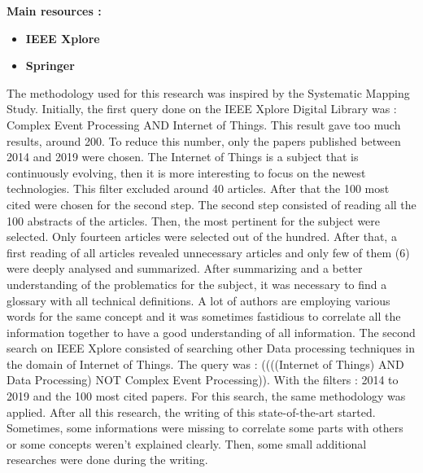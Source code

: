 \documentclass[11pt]{article}
\begin{document}
\textbf{Main resources :}
\begin{itemize}
	\item \textbf{IEEE Xplore} 
	\item \textbf{Springer} 
\end{itemize}

The methodology used for this research was inspired by the Systematic Mapping Study. \cite{sms} Initially, the first query done on the IEEE Xplore Digital Library was : Complex Event Processing AND Internet of Things. This result gave too much results, around 200. To reduce this number, only the papers published between 2014 and 2019 were chosen. The Internet of Things is a subject that is continuously evolving, then it is more interesting to focus on the newest technologies. This filter excluded around 40 articles. After that the 100 most cited were chosen for the second step.
\newline
\newline
The second step consisted of reading all the 100 abstracts of the articles. Then, the most pertinent for the subject were selected. Only fourteen articles were selected out of the hundred. After that, a first reading of all articles revealed unnecessary articles and only few of them (6) were deeply analysed and summarized. After summarizing and a better understanding of the problematics for the subject, it was necessary to find a glossary \cite{glossary} with all technical definitions. A lot of authors are employing various words for the same concept and it was sometimes fastidious to correlate all the information together to have a good understanding of all information.  
\newline
\newline
The second search on IEEE Xplore consisted of searching other Data processing techniques in the domain of Internet of Things. The query was : ((((Internet of Things) AND Data Processing) NOT Complex Event Processing)). With the filters :  2014 to 2019 and the 100 most cited papers. For this search, the same methodology was applied.
\newline
\newline
After all this research, the writing of this state-of-the-art started. Sometimes, some informations were missing to correlate some parts with others or some concepts weren't explained clearly. Then, some small additional researches were done during the writing.


\newpage
\listoffigures
\nocite{*}
\printbibliography
\end{document}
